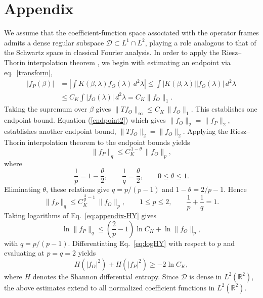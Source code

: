 \documentclass[aps,pra,onecolumn,nofootinbib,superscriptaddress,showpacs]{revtex4}
\begin{document}
\section{Appendix}
\noindent We assume that the coefficient-function space associated with the
operator frames admits a dense regular subspace
$\mathcal D\subset L^1\cap L^2$, playing a role analogous to that of
the Schwartz space in classical Fourier analysis.
%
%
%
In order to apply the Riesz--Thorin interpolation theorem \cite{ReedSimon2}, we begin with estimating an endpoint via  eq.~\eqref{transform},
\begin{align}
|f_P(\beta)|
&=
\left|
\int
K(\beta,\lambda)
f_O(\lambda)\,
d^2\lambda
\right|
\nonumber\le
\int
|K(\beta,\lambda)|
|f_O(\lambda)|
\,d^2\lambda
\nonumber\\
&\le
C_K
\int
|f_O(\lambda)|
\,d^2\lambda
\nonumber=
C_K\|f_O\|_1 .
\end{align}
%
Taking the supremum over $\beta$ gives
%
$\|Tf_O\|_\infty
\le
C_K\,\|f_O\|_1.$
%
This establishes one endpoint bound. Equation (\ref{endpoint2}) which gives $\|f_O\|_2=\|f_P\|_2$, establishes another endpoint bound,
%
%
$\|Tf_O\|_2
=
\|f_O\|_2$.
%
Applying the Riesz--Thorin interpolation theorem \cite{ReedSimon2} to the endpoint bounds
yields
\begin{equation}
\|f_P\|_q
\le
C_K^{\,1-\theta}
\,
\|f_O\|_p,
\end{equation}
%
where
%
\begin{equation}
\frac{1}{p}
=
1-\frac{\theta}{2},
\qquad
\frac{1}{q}
=
\frac{\theta}{2},
\qquad
0\le\theta\le1.
\end{equation}
%
Eliminating $\theta$, these relations give
$q=p/(p-1)$ and $1-\theta=2/p-1$. Hence
\begin{equation}
\|f_P\|_q
\le
C_K^{\,\frac{2}{p}-1}
\,
\|f_O\|_p,
\qquad
1\le p\le2,
\qquad
\frac1p+\frac1q=1.
\label{eq:appendix-HY}
\end{equation}
%
%
Taking logarithms of Eq.~\eqref{eq:appendix-HY} gives
\begin{equation}
\ln \|f_P\|_q
\le
\left(\frac{2}{p}-1\right)\ln C_K
+
\ln \|f_O\|_p ,
\label{eq:logHY}
\end{equation}
with $q=p/(p-1)$.
%
%
%
%
Differentiating Eq.~\eqref{eq:logHY} with respect to $p$
and evaluating at $p=q=2$ yields
%
%
%
%
\begin{equation}
H(|f_O|^2)
+
H(|f_P|^2)
\ge
-2\ln C_K,
\end{equation}
where
%
$H$ denotes the Shannon differential entropy.
%
Since $\mathcal D$ is dense in $L^2(\mathbb R^2)$, the above estimates extend
to all normalized coefficient functions in $L^2(\mathbb R^2)$.
\end{document}
